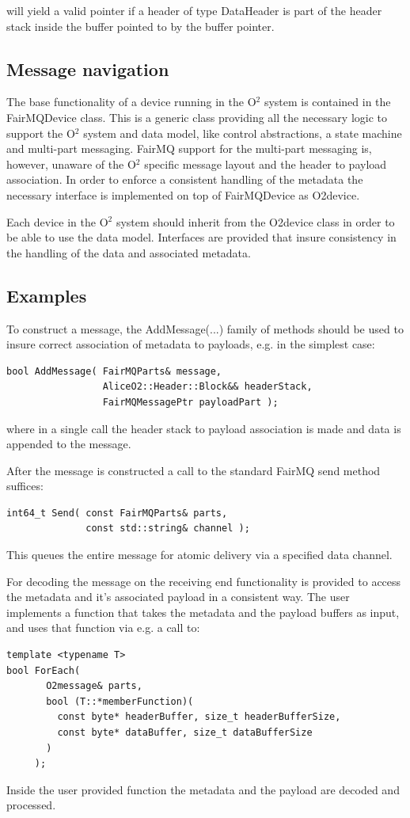 \documentclass[a4paper,twoside]{article}
\def\O2{O$^2$}
\begin{document}
will yield a valid pointer if a header of type DataHeader is part of the header stack inside the buffer pointed to by the buffer pointer.

\subsection{Message navigation}
The base functionality of a device running in the \O2 system is contained in the FairMQDevice class. This is a generic class providing all the necessary logic to support the \O2 system and data model, like control abstractions, a state machine and multi-part messaging. FairMQ support for the multi-part messaging is, however, unaware of the \O2 specific message layout and the header to payload association. In order to enforce a consistent handling of the metadata the necessary interface is implemented on top of FairMQDevice as O2device.

Each device in the \O2 system should inherit from the O2device class in order to be able to use the data model. Interfaces are provided that insure consistency in the handling of the data and associated metadata.

\subsection{Examples}
To construct a message, the AddMessage(...) family of methods should be used to insure correct association of metadata to payloads, e.g. in the simplest case:
\begin{lstlisting}
bool AddMessage( FairMQParts& message,
                 AliceO2::Header::Block&& headerStack,
                 FairMQMessagePtr payloadPart );
\end{lstlisting}
where in a single call the header stack to payload association is made and data is appended to the message.

After the message is constructed a call to the standard FairMQ send method suffices:
\begin{lstlisting}
int64_t Send( const FairMQParts& parts,
              const std::string& channel );
\end{lstlisting}
This queues the entire message for atomic delivery via a specified data channel.

For decoding the message on the receiving end functionality is provided to access the metadata and it's associated payload in a consistent way. The user implements a function that takes the metadata and the payload buffers as input, and uses that function via e.g. a call to:
\begin{lstlisting}
template <typename T>
bool ForEach(
       O2message& parts,
       bool (T::*memberFunction)(
         const byte* headerBuffer, size_t headerBufferSize,
         const byte* dataBuffer, size_t dataBufferSize
       )
     );
\end{lstlisting}
Inside the user provided function the metadata and the payload are decoded and processed.

\printbibliography
\end{document}
